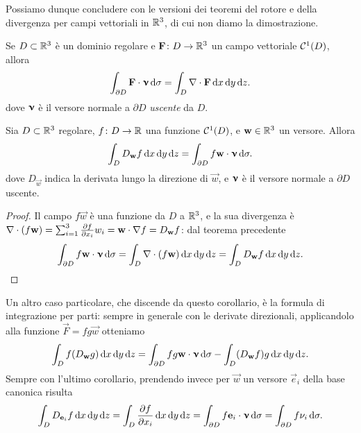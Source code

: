 Possiamo dunque concludere con le versioni dei teoremi del rotore e della divergenza per campi vettoriali in $\mathbb{R}^3$, di cui non diamo la dimostrazione.
\begin{teorema} \label{t:divergenza-R3}
	Se $D\subset\mathbb{R}^3$ è un dominio regolare e $\mathbf{F}\colon D\to\mathbb{R}^3$ un campo vettoriale $\mathcal{C}^{{1}}(D)$, allora
	\begin{equation}
		\int_{\partial D}{\mathbf{F}}\cdot{\bm{\upnu}}\,\textup{d}\sigma=\int_D\nabla\cdot\mathbf{F}\,\textup{d} x\,\textup{d} y\,\textup{d} z.
		\label{eq:divergenza-R3}
	\end{equation}
	dove $\bm{\upnu}$ è il versore normale a $\partial D$ \emph{uscente} da $D$.
\end{teorema}
\begin{corollario}
	Sia $D\subset\mathbb{R}^3$ regolare, $f\colon D\to\mathbb{R}$ una funzione $\mathcal{C}^{{1}}(D)$, e $\mathbf{w}\in\mathbb{R}^3$ un versore.
	Allora
	\begin{equation}
		\int_DD_{\mathbf{w}}f\,\textup{d} x\,\textup{d} y\,\textup{d} z=\int_{\partial D}f{\mathbf{w}}\cdot{\bm{\upnu}}\,\textup{d}\sigma.
	\end{equation}
	dove $D_{\vec w}$ indica la derivata lungo la direzione di $\vec w$, e $\bm{\upnu}$ è il versore normale a $\partial D$ uscente.
\end{corollario}
\begin{proof}
	Il campo $f\vec w$ è una funzione da $D$ a $\mathbb{R}^3$, e la sua divergenza è $\nabla\cdot(f\mathbf{w})=\sum_{i=1}^3\frac{\partial {f}}{\partial {x_i}}w_i={\mathbf{w}}\cdot{\nabla f}=D_{\mathbf{w}}f$: dal teorema precedente
	\begin{equation}
		\int_{\partial D}{f\mathbf{w}}\cdot{\bm{\upnu}}\,\textup{d}\sigma=\int_D\nabla\cdot(f\mathbf{w})\,\textup{d} x\,\textup{d} y\,\textup{d} z=\int_DD_{\mathbf{w}}f\,\textup{d} x\,\textup{d} y\,\textup{d} z.\qedhere
	\end{equation}
\end{proof}
Un altro caso particolare, che discende da questo corollario, è la formula di integrazione per parti: sempre in generale con le derivate direzionali, applicandolo alla funzione $\vec F=fg\vec w$ otteniamo
\begin{equation}
	\int_Df(D_{\mathbf{w}}g)\,\textup{d} x\,\textup{d} y\,\textup{d} z=\int_{\partial D}fg{\mathbf{w}}\cdot{\bm{\upnu}}\,\textup{d}\sigma-\int_D(D_{\mathbf{w}}f)g\,\textup{d} x\,\textup{d} y\,\textup{d} z.
\end{equation}
Sempre con l'ultimo corollario, prendendo invece per $\vec w$ un versore $\vec e_i$ della base canonica risulta
\begin{equation}
	\int_DD_{\mathbf{e}_i}f\,\textup{d} x\,\textup{d} y\,\textup{d} z=\int_D\frac{\partial {f}}{\partial {x_i}}\,\textup{d} x\,\textup{d} y\,\textup{d} z=\int_{\partial D}{f\mathbf{e}_i}\cdot{\bm{\upnu}}\,\textup{d}\sigma=\int_{\partial D}f\nu_i\,\textup{d}\sigma.
\end{equation}
